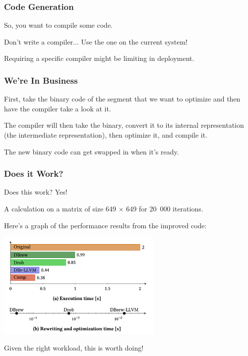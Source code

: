 \begin{frame}
\frametitle{Code Generation}

So, you want to compile some code. 

Don't write a compiler... Use the one on the current system!

Requiring a specific compiler might be limiting in deployment.

\end{frame}


\begin{frame}
\frametitle{We're In Business}

First, take the binary code of the segment that we want to optimize and then have the compiler take a look at it. 

The compiler will then take the binary, convert it to its internal representation (the intermediate representation), then optimize it, and compile it. 

The new binary code can get swapped in when it's ready.

\end{frame}

\begin{frame}
\frametitle{Does it Work?}


Does this work? Yes!

A calculation on a matrix of size 649 $\times$ 649 for 20~000 iterations. 

Here's a graph of the performance results from the improved code:

\begin{center}
	\includegraphics[width=0.6\textwidth]{images/rewriting.png}
\end{center}

Given the right workload, this is worth doing!

\end{frame}


